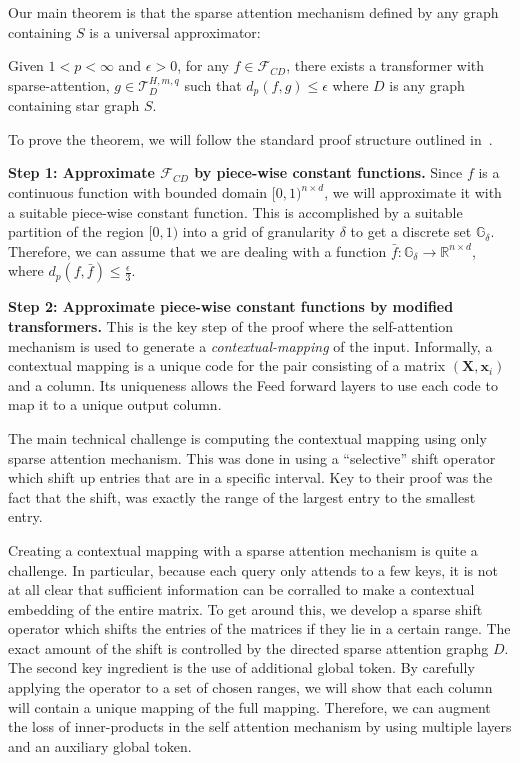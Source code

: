  
Our main theorem is that the sparse attention mechanism defined by any graph containing $S$ is a universal approximator:

\begin{theorem}
\label{thm:universal}
    Given $1 < p < \infty$ and $\epsilon > 0 $, for any $f \in \mathcal{F}_{CD}$, there exists a transformer with sparse-attention, $g \in \mathcal{T}_D^{H,m,q}$  such that 
    $d_p(f,g)\leq \epsilon$ where $D$ is any graph containing star graph $S$. 
\end{theorem}

To prove the theorem, we will follow the standard proof structure outlined in~\citep{Yun19}.

\textbf{Step 1: Approximate $\mathcal{F}_{CD}$ by piece-wise constant functions.} Since $f$ is a continuous function with bounded domain $[0,1)^{n \times d}$, we will approximate it with a  suitable piece-wise constant function. This is accomplished by a suitable partition of the  region $[0,1)$ into a grid of granularity $\delta$ to get a discrete set $\ensuremath{\mathbb{G}_{\delta}}$. Therefore, we can assume that we are dealing with a function 
    $\bar{f}: \ensuremath{\mathbb{G}_{\delta}} \to \mathbb{R}^{n \times d}$, where $d_p(f,\bar{f}) \leq \frac{\epsilon}{3}$. 

\textbf{Step 2:  Approximate piece-wise constant functions by modified transformers.} This is the key step  of the proof where  the self-attention mechanism is used to generate a \emph{contextual-mapping} of the input. Informally, a contextual mapping is a unique code for the pair consisting of a matrix $({\bm{X}},{\bm{x}}_{i})$ and a column. Its uniqueness allows the Feed forward layers to use each code to map it to a unique output column. 

    The main technical challenge is computing the contextual mapping using only sparse attention mechanism. This was done in \cite{Yun19} using a ``selective'' shift operator which shift up entries that are in a specific interval. Key to their proof was the fact that the shift, was exactly the range of the largest entry to the smallest entry.  

    Creating a contextual mapping with a sparse attention mechanism is quite a challenge. In particular, because each query only attends to a few keys, it is not at all clear that sufficient information can be corralled to make a contextual embedding of the entire matrix. To get around this, we develop a sparse shift operator which shifts the entries of the matrices if they lie in a certain range. The exact amount of the shift is controlled by the directed sparse attention graphg $D$. The second key ingredient is the use of additional global token.  By carefully applying the operator to a set of chosen ranges, we will show that each column will contain a unique mapping of the full mapping.   Therefore, we can augment the loss of inner-products in the self attention mechanism by using multiple layers and an auxiliary global token. 

